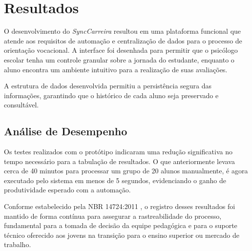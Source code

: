 \chapter{Resultados}

O desenvolvimento do \textit{SyncCarreira} resultou em uma plataforma funcional que atende aos requisitos de automação e centralização de dados para o processo de orientação vocacional. A interface foi desenhada para permitir que o psicólogo escolar tenha um controle granular sobre a jornada do estudante, enquanto o aluno encontra um ambiente intuitivo para a realização de suas avaliações.

A estrutura de dados desenvolvida permitiu a persistência segura das informações, garantindo que o histórico de cada aluno seja preservado e consultável.

\section{Análise de Desempenho}

Os testes realizados com o protótipo indicaram uma redução significativa no tempo necessário para a tabulação de resultados. O que anteriormente levava cerca de 40 minutos para processar um grupo de 20 alunos manualmente, é agora executado pelo sistema em menos de 5 segundos, evidenciando o ganho de produtividade esperado com a automação. 

Conforme estabelecido pela NBR 14724:2011 \cite{NBR14724:2011}, o registro desses resultados foi mantido de forma contínua para assegurar a rastreabilidade do processo, fundamental para a tomada de decisão da equipe pedagógica e para o suporte técnico oferecido aos jovens na transição para o ensino superior ou mercado de trabalho.